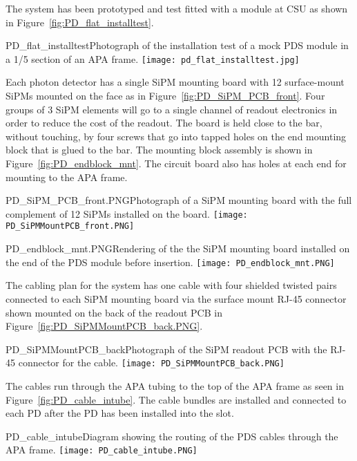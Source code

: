 The system has been prototyped and test fitted with a module at CSU 
as shown in Figure~\ref{fig:PD_flat_installtest}.
\begin{cdrfigure}
  {PD_flat_installtest}{Photograph of the installation
    test of a mock PDS module in a 1/5 section of an APA frame.}
\texttt{[image: pd\_flat\_installtest.jpg]}
\end{cdrfigure}


Each photon detector has a single SiPM mounting board with 12 surface-mount SiPMs 
mounted on the face as in Figure~\ref{fig:PD_SiPM_PCB_front}.
Four groups of $3$ SiPM elements will go to a single 
channel of readout electronics in order to reduce the cost of the readout.
The board is held close to the bar, without touching, by four screws that go into 
tapped holes on the end mounting block that is glued to the bar.  
The mounting block assembly is shown in Figure~\ref{fig:PD_endblock_mnt}.
The circuit board also has holes at each end for mounting to the APA frame.  
\begin{cdrfigure}
  {PD_SiPM_PCB_front.PNG}{Photograph of a SiPM mounting board
    with the full complement of 12 SiPMs installed on the board.}
\texttt{[image: PD\_SiPMMountPCB\_front.PNG]}
\end{cdrfigure}
\begin{cdrfigure}
  {PD_endblock_mnt.PNG}{Rendering of the the SiPM mounting board
    installed on the end of the PDS module before insertion.}
\texttt{[image: PD\_endblock\_mnt.PNG]}
\end{cdrfigure}


The cabling plan for the system has one cable with four shielded twisted pairs 
connected to each SiPM mounting board via the surface mount RJ-45 connector
shown mounted on the back of the readout PCB in 
Figure~\ref{fig:PD_SiPMMountPCB_back.PNG}.  
\begin{cdrfigure}
  {PD_SiPMMountPCB_back}{Photograph of the SiPM readout PCB with the 
    RJ-45 connector for the cable.}
\texttt{[image: PD\_SiPMMountPCB\_back.PNG]}
\end{cdrfigure}
The cables run through the APA tubing to the top of the APA frame as seen
in Figure~\ref{fig:PD_cable_intube}.
The cable bundles are installed and connected to each PD 
after the PD has been installed into the slot.
\begin{cdrfigure}
  {PD_cable_intube}{Diagram showing the routing of the PDS cables
    through the APA frame.}
\texttt{[image: PD\_cable\_intube.PNG]}
\end{cdrfigure}


